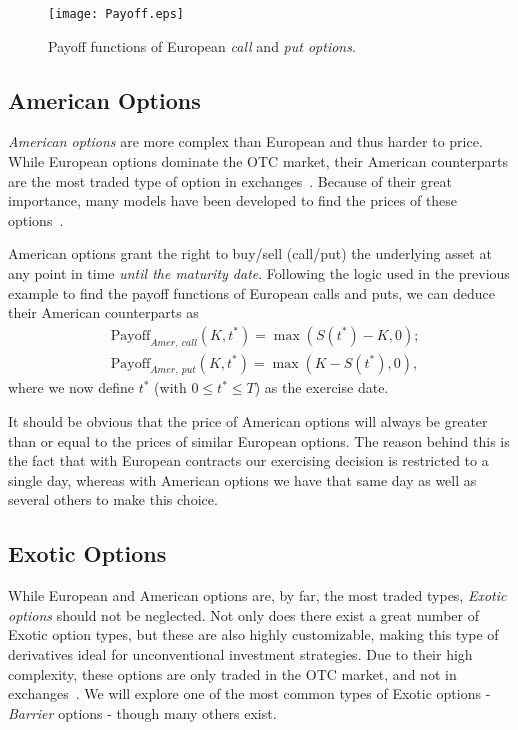 \begin{figure}[!htb]
    \centering
      \texttt{[image: Payoff.eps]}
      \caption[Payoff functions of European call and put options]{Payoff functions of European \emph{call} and \emph{put options}.}\label{fig:Payoff}
    \end{figure}
    



\subsection{American Options}
\emph{American options} are more complex than European and thus harder to price. While European options dominate the OTC market, their American counterparts are the most traded type of option in exchanges~\citep{InvAmer}. Because of their great importance, many models have been developed to find the prices of these options~\citep{Longstaff}.

American options grant the right to buy/sell (call/put) the underlying asset at any point in time \emph{until the maturity date}. Following the logic used in the previous example to find the payoff functions of European calls and puts, we can deduce their American counterparts as
\begin{equation}
\begin{split}
&\text{Payoff}_{Amer,\ call}(K,t^*)=\max\left(S(t^*)-K,0\right);\\
&\text{Payoff}_{Amer,\ put}(K,t^*)=\max\left(K-S(t^*),0\right),
\end{split}
\end{equation}
\noindent where we now define $t^*$ (with $0\leq t^*\leq T$) as the exercise date.

It should be obvious that the price of American options will always be greater than or equal to the prices of similar European options. The reason behind this is the fact that with European contracts our exercising decision is restricted to a single day, whereas with American options we have that same day as well as several others to make this choice.


\subsection{Exotic Options}
While European and American options are, by far, the most traded types, \emph{Exotic options} should not be neglected. Not only does there exist a great number of Exotic option types, but these are also highly customizable, making this type of derivatives ideal for unconventional investment strategies. Due to their high complexity, these options are only traded in the OTC market, and not in exchanges~\citep{InvExotic}. We will explore one of the most common types of Exotic options - \emph{Barrier} options - though many others exist.


